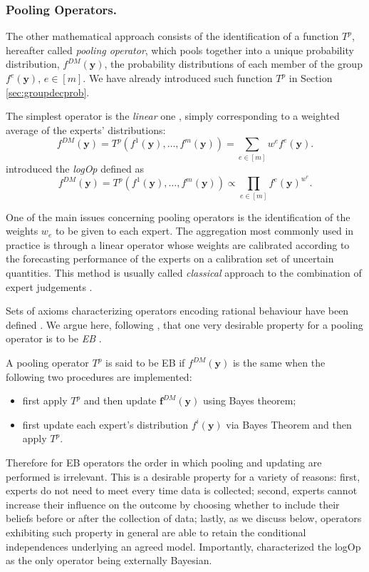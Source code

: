 \subsubsection{Pooling Operators.}
\label{sec:pool}
The other mathematical approach consists of the identification of a function $T^p$, hereafter called \textit{pooling operator}, which pools together into a unique probability distribution, $f^{DM}(\bm{y})$, the probability distributions of each member of the group $f^e(\bm{y})$, $e\in[m]$. We have already introduced such function $T^p$ in Section \ref{sec:groupdecprob}.

The simplest operator is the \textit{linear} one \citep{Stone1961}, simply corresponding to a weighted average of the experts' distributions:
\begin{equation*}
\label{eq:linearpool}
f^{DM}(\bm{y})=T^p(f^1(\bm{y}),\dots, f^m(\bm{y}))=\sum_{e\in[m]} w^ef^e(\bm{y}).
\end{equation*} 
\citet{Bacharach1975} introduced the \textit{\gls{logOp}} defined as
\begin{equation*}
\label{eq:logpool}
f^{DM}(\bm{y})=T^p(f^1(\bm{y}),\dots, f^m(\bm{y}))\propto\prod_{e\in[m]}f^e(\bm{y})^{w^e}.
\end{equation*}

One of the main issues concerning pooling operators is the identification of the weights $w_e$ to be given to each expert. The aggregation most commonly used in practice is through a linear operator whose weights are calibrated according to the forecasting performance of the experts on a calibration set of uncertain quantities. This method is usually called \textit{classical} approach to the combination of expert judgements \citep{Cooke1991a}.

Sets of axioms characterizing operators encoding rational behaviour have been defined \citep[see for a review][]{Genest86}.  We argue here, following \citet{Faria1997}, that one very desirable property for a pooling operator is to be \textit{\gls{EB}} \citep{Madansky64}. 
\begin{definition}
A pooling operator $T^p$ is said to be \gls{EB} if  $f^{DM}(\bm{y})$ is the same when the following two procedures are implemented:
\begin{itemize}
\item first apply $T^p$ and then update $\bm{f}^{DM}(\bm{y})$ using Bayes theorem;
\item first update each expert's distribution $f^i(\bm{y})$ via Bayes Theorem and then apply $T^p$. 
\end{itemize}
\end{definition} 
Therefore for \gls{EB} operators the order in which pooling and updating are performed is irrelevant. This is a desirable property for a variety of reasons: first, experts do not need to meet every time data is collected; second, experts cannot increase their influence on the outcome by choosing whether to include their beliefs before or after the collection of data; lastly, as we discuss below, operators exhibiting such property in general are able to retain the conditional independences underlying an agreed model. Importantly, \citet{Genest84} characterized the \gls{logOp} as the only operator being externally Bayesian.

